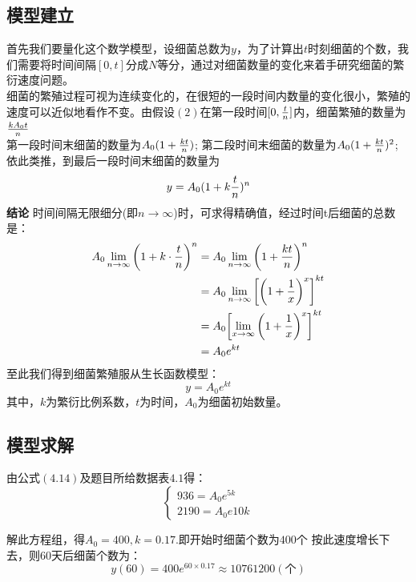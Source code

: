 \documentclass[openany]{progbookcn}
\begin{document}
\subsection{模型建立}
\indent 首先我们要量化这个数学模型，设细菌总数为$y$，为了计算出$t$时刻细菌的个数，我们需要将时间间隔$[0,t]$分成$N$等分，通过对细菌数量的变化来着手研究细菌的繁衍速度问题。\\
\indent 细菌的繁殖过程可视为连续变化的，在很短的一段时间内数量的变化很小，繁殖的速度可以近似地看作不变。由假设$(2)$在第一段时间$[0,{t\over n}]$内，细菌繁殖的数量为${kA_0t}\over n$\\
\indent 第一段时间末细菌的数量为$A_0(1+{{kt}\over n})$;
\indent 第二段时间末细菌的数量为$A_0(1+{{kt}\over n})^2$;
\indent 依此类推，到最后一段时间末细菌的数量为
\begin{equation}
y=A_0(1+k{t\over n})^n
\end{equation}
\noindent\textbf{结论}
\indent 时间间隔无限细分(即$n\to\infty$)时，可求得精确值，经过时间t后细菌的总数是：
\begin{equation}
\begin{split}
A_0\mathop {\lim }\limits_{n \to \infty } {\left( {1 +{k \cdot {t\over {n}}}} \right)^n}&= A_0 \mathop {\lim }\limits_{n \to \infty } {\left( {1 + {{kt}\over n}} \right)^n}\\
&= A_0\mathop {\lim }\limits_{n \to \infty } {\left[ {{{\left( {1 + \frac{1}{x}} \right)}^x}} \right]^{kt}}\\
&={A_0}{\left[ {\mathop {\lim }\limits_{x \to \infty } {{\left( {1 + \frac{1}{x}} \right)}^x}} \right]^{kt}}\\
&={A_0}{e^{kt}}
\end{split}
\end{equation}
\indent 至此我们得到细菌繁殖服从生长函数模型：
\begin{equation}
y=A_0e^{kt}
\end{equation}
\indent 其中，$k$为繁衍比例系数，$t$为时间，$A_0$为细菌初始数量。
\subsection{模型求解}
\indent 由公式$(4.14)$及题目所给数据表$4.1$得：
\begin{equation}
\begin{cases}
936=A_0e^{5k}\\
2190=A_0e{10k}
\end{cases}
\end{equation}

\indent 解此方程组，得$A_0=400,k=0.17$.即开始时细菌个数为$400$个
\indent 按此速度增长下去，则60天后细菌个数为：
\begin{equation}\nonumber
y(60)=400e^{60\times 0.17}\approx 10761200(\mbox{个})
\end{equation}
\end{document}

